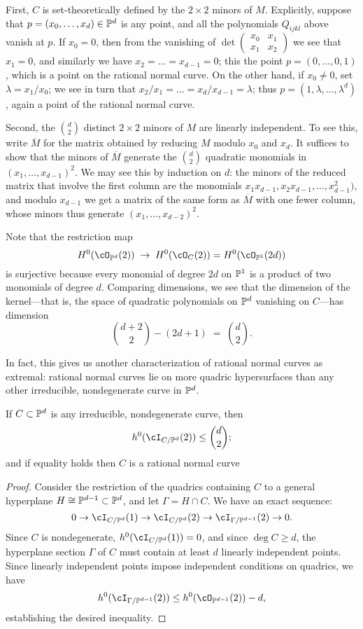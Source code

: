 First, $C$ is set-theoretically defined by the $2\times 2$ minors of $M$. Explicitly, suppose that $p = (x_0,\dots,x_d) \in \PP^d$ is any point, and all the polynomials $Q_{ijkl}$ above vanish at $p$. If $x_0 = 0$, then from the vanishing of 
$\det \begin{pmatrix}
x_0 & x_1  \\
x_1 & x_2 
\end{pmatrix}$ 
we see that $x_1 = 0$, and similarly we have $x_2 = \dots = x_{d-1}=0$; this the point $p = (0,\dots,0,1)$, which is a point on the rational normal curve. On the other hand, if $x_0 \neq 0$, set $\lambda = x_1/x_0$; we see in turn that $x_2/x_1 = \dots = x_d/x_{d-1} = \lambda$; thus $p = (1, \lambda, \dots,\lambda^d)$, again a point of the rational normal curve.

Second, the ${d\choose 2}$ distinct $2\times 2$ minors of $M$ are linearly independent. To see this, write $\overline M$
for the matrix obtained by reducing $M$
modulo $x_0$ and $x_d$. It suffices to show that the minors of $\overline M$ generate the ${d\choose 2}$ quadratic monomials in $(x_1, \dots, x_{d-1})^2$. We may see this by induction on $d$: the minors of the reduced matrix
that involve the first column are the monomials 
$x_1x_{d-1}, x_2x_{d-1}, \dots, x_{d-1}^2)$, and modulo $x_{d-1}$ we get a matrix of the same form as $\overline M$ with one fewer column, whose
minors thus generate $(x_1, \dots, x_{d-2})^2$.

Note that
the restriction map
$$
H^0(\cO_{\PP^d}(2)) \; \to \; H^0(\cO_{C}(2)) = H^0(\cO_{\PP^1}(2d))
$$
 is surjective  because every monomial of degree $2d$ on $\PP^1$ is a product of two monomials of degree $d$. Comparing dimensions, we see that the dimension of the kernel---that is, the space of quadratic polynomials on $\PP^d$ vanishing on $C$---has dimension
$$
\binom{d+2}{2} - (2d+1) \; = \; \binom{d}{2}.
$$


In fact, this gives us another characterization of rational normal curves as extremal: rational normal curves lie on more quadric hypersurfaces than any other irreducible, nondegenerate curve in $\PP^d$.

\begin{proposition}\label{rnc on most quadrics}
If $C \subset \PP^d$ is any irreducible, nondegenerate curve, then
$$
h^0(\cI_{C/\PP^d}(2)) \leq  \binom{d}{2};
$$
and if equality holds then $C$ is a rational normal curve
\end{proposition}

\begin{proof}
Consider the restriction of the quadrics containing $C$ to a general hyperplane $H \cong \PP^{d-1} \subset \PP^d$, and let $\Gamma = H \cap C$. We have an exact sequence:
$$
0 \to \cI_{C/\PP^d}(1) \to \cI_{C/\PP^d}(2) \to \cI_{\Gamma/\PP^{d-1}}(2) \to 0.
$$ 
Since $C$ is nondegenerate, $h^0(\cI_{C/\PP^d}(1)) = 0$, and since $\deg C \geq d$, the hyperplane section $\Gamma$ of $C$ must contain at least $d$ linearly independent points. Since linearly independent points impose independent conditions on quadrics, we have
$$
h^0(\cI_{\Gamma/\PP^{d-1}}(2)) \leq h^0(\cO_{\PP^{d-1}}(2)) - d,
$$
establishing the desired inequality.
\end{proof}


